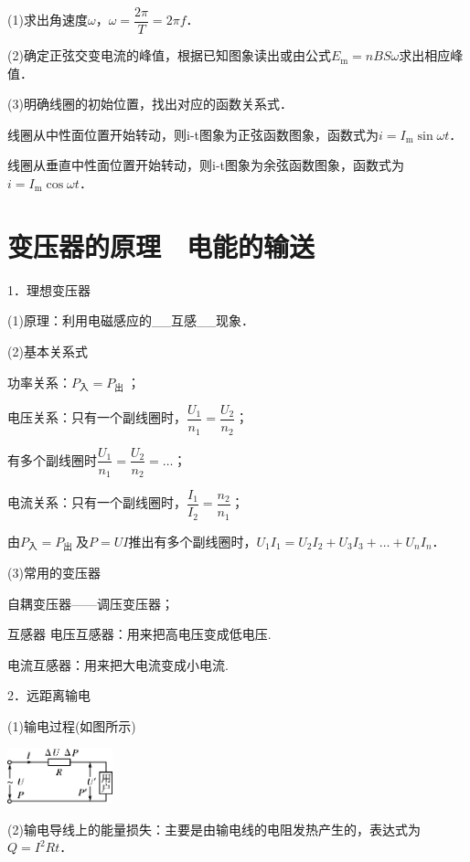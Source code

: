 \documentclass[cn,10.5pt,chinese,mac,chinesefont=founder]{elegantbook}
\begin{document}
(1)求出角速度$\omega$，$\omega=\dfrac{2 \pi}{T}=2 \pi f$．

(2)确定正弦交变电流的峰值，根据已知图象读出或由公式$E_{\mathrm{m}}=n B S \omega$求出相应峰值．

(3)明确线圈的初始位置，找出对应的函数关系式．

线圈从中性面位置开始转动，则i-t图象为正弦函数图象，函数式为$i=I_{\mathrm{m}} \sin \omega t$．

线圈从垂直中性面位置开始转动，则i-t图象为余弦函数图象，函数式为$i=I_{\mathrm{m}} \cos \omega t$．
\newpage
\section{变压器的原理　电能的输送}

1．理想变压器

(1)原理：利用电磁感应的\_\_互感\_\_现象．

(2)基本关系式

功率关系：$P_{\text{入}}=P_{\text {出 }}$；

电压关系：只有一个副线圈时，$\dfrac{U_{1}}{n_{1}}=\dfrac{U_{2}}{n_{2}}$；

有多个副线圈时$\dfrac{U_{1}}{n_{1}}=\dfrac{U_{2}}{n_{2}}=\ldots$；

电流关系：只有一个副线圈时，$\dfrac{I_{1}}{I_{2}}=\dfrac{n_{2}}{n_{1}}$；

由$P_{\text{入}}=P_{\text {出 }}$及$P=UI$推出有多个副线圈时，$U_{1} I_{1}=U_{2} I_{2}+U_{3} I_{3}+\ldots+U_{n} I_{n}$．

(3)常用的变压器

自耦变压器------调压变压器；

互感器
电压互感器：用来把高电压变成低电压.

电流互感器：用来把大电流变成小电流.


2．远距离输电

(1)输电过程(如图所示)

\begin{center}\includegraphics[width=1.19792in,height=0.63194in]{media/image450.png}\end{center}

(2)输电导线上的能量损失：主要是由输电线的电阻发热产生的，表达式为$Q=I^2Rt$．
\end{document}
